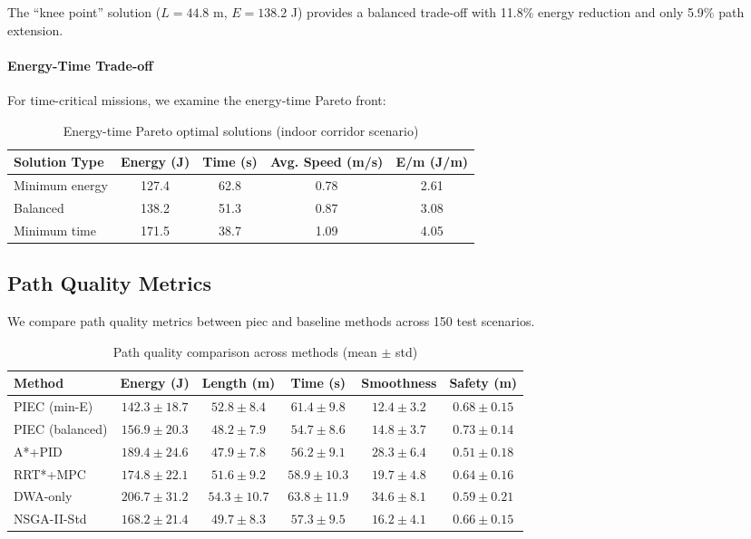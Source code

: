 The ``knee point'' solution ($L = 44.8$ m, $E = 138.2$ J) provides a balanced trade-off with 11.8\% energy reduction and only 5.9\% path extension.

\paragraph{Energy-Time Trade-off}
For time-critical missions, we examine the energy-time Pareto front:

\begin{table}[htbp]
\centering
\caption{Energy-time Pareto optimal solutions (indoor corridor scenario)}
\label{tab:pareto_energy_time}
\begin{tabular}{lcccc}
\toprule
\textbf{Solution Type} & \textbf{Energy (J)} & \textbf{Time (s)} & \textbf{Avg. Speed (m/s)} & \textbf{E/m (J/m)} \\
\midrule
Minimum energy & 127.4 & 62.8 & 0.78 & 2.61 \\
Balanced & 138.2 & 51.3 & 0.87 & 3.08 \\
Minimum time & 171.5 & 38.7 & 1.09 & 4.05 \\
\bottomrule
\end{tabular}
\end{table}


\subsection{Path Quality Metrics}

We compare path quality metrics between \acrshort{piec} and baseline methods across 150 test scenarios.

\begin{table}[htbp]
\centering
\caption{Path quality comparison across methods (mean $\pm$ std)}
\label{tab:path_quality_comparison}
\begin{tabular}{lccccc}
\toprule
\textbf{Method} & \textbf{Energy (J)} & \textbf{Length (m)} & \textbf{Time (s)} & \textbf{Smoothness} & \textbf{Safety (m)} \\
\midrule
PIEC (min-E) & $\mathbf{142.3 \pm 18.7}$ & $52.8 \pm 8.4$ & $61.4 \pm 9.8$ & $\mathbf{12.4 \pm 3.2}$ & $0.68 \pm 0.15$ \\
PIEC (balanced) & $156.9 \pm 20.3$ & $\mathbf{48.2 \pm 7.9}$ & $\mathbf{54.7 \pm 8.6}$ & $14.8 \pm 3.7$ & $\mathbf{0.73 \pm 0.14}$ \\
A*+PID & $189.4 \pm 24.6$ & $47.9 \pm 7.8$ & $56.2 \pm 9.1$ & $28.3 \pm 6.4$ & $0.51 \pm 0.18$ \\
RRT*+MPC & $174.8 \pm 22.1$ & $51.6 \pm 9.2$ & $58.9 \pm 10.3$ & $19.7 \pm 4.8$ & $0.64 \pm 0.16$ \\
DWA-only & $206.7 \pm 31.2$ & $54.3 \pm 10.7$ & $63.8 \pm 11.9$ & $34.6 \pm 8.1$ & $0.59 \pm 0.21$ \\
NSGA-II-Std & $168.2 \pm 21.4$ & $49.7 \pm 8.3$ & $57.3 \pm 9.5$ & $16.2 \pm 4.1$ & $0.66 \pm 0.15$ \\
\bottomrule
\end{tabular}
\end{table}

